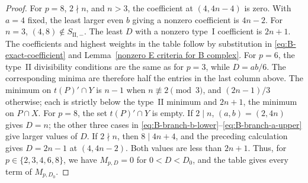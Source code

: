 \documentclass[11pt,a4paper]{amsart}
\theoremstyle{plain}
\numberwithin{equation}{section}
\newenvironment{pf}{\begin{proof}}{\end{proof}}
\begin{document}
\begin{pf}
	For \(p=8\), \(2\nmid n\), and \(n>3\), the coefficient at
	\((4,4n-4)\) is zero.
	With \(a=4\) fixed, the least larger even \(b\) giving a
	nonzero coefficient is \(4n-2\).
	For \(n=3\), \((4,8)\notin S_{\mathrm{II},-}\).
	The least \(D\) with a nonzero type~\(\mathrm I\) coefficient
	is \(2n+1\). The coefficients and highest weights in the table
	follow by substitution in \eqref{eq:B-exact-coefficient} and
	Lemma~\ref{nonzero E criteria for B complex}.
	For \(p=6\), the type~\(\mathrm{II}\) divisibility conditions
	are the same as for \(p=3\), while \(D=ab/6\).
	The corresponding minima are therefore half the entries in the
	last column above. The minimum on \(t(P)'\cap Y\) is \(n-1\) when
	\(n\not\equiv2\pmod3\), and \((2n-1)/3\) otherwise; each is
	strictly below the type~\(\mathrm{II}\) minimum and \(2n+1\),
	the minimum on \(P\cap X\).
	For \(p=8\), the set \(t(P)'\cap Y\) is empty. If \(2\mid n\), \((a,b)=(2,4n)\) gives \(D=n\); the other three cases in
	\eqref{eq:B-branch-b-lower}--\eqref{eq:B-branch-a-upper} give larger
	values of \(D\). If \(2\nmid n\), then \(8\mid4n+4\), and
	the preceding calculation gives \(D=2n-1\) at \((4,4n-2)\).
	Both values are less than \(2n+1\). Thus, for
	\(p\in\{2,3,4,6,8\}\), we have \(M_{p,D}=0\) for
	\(0<D<D_0\), and the table gives every term of \(M_{p,D_0}\).
	
	\smallskip
	

\end{pf}
\end{document}

